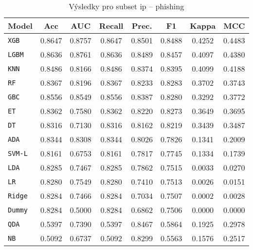 \begin{table}[H]
  \centering
  \small
  \caption{Výsledky pro subset ip – phishing}
  \begin{tabular}{|l|c|c|c|c|c|c|c|}
    \hline
    \textbf{Model} & \textbf{Acc} & \textbf{AUC} & \textbf{Recall} & \textbf{Prec.} & \textbf{F1} & \textbf{Kappa} & \textbf{MCC} \\
    \hline
    \texttt{XGB} & 0.8647 & 0.8757 & 0.8647 & 0.8501 & 0.8488 & 0.4252 & 0.4483 \\
    \texttt{LGBM} & 0.8636 & 0.8761 & 0.8636 & 0.8489 & 0.8457 & 0.4097 & 0.4380 \\
    \texttt{KNN} & 0.8486 & 0.8166 & 0.8486 & 0.8374 & 0.8395 & 0.4099 & 0.4188 \\
    \texttt{RF} & 0.8367 & 0.8196 & 0.8367 & 0.8233 & 0.8283 & 0.3702 & 0.3743 \\
    \texttt{GBC} & 0.8556 & 0.8549 & 0.8556 & 0.8387 & 0.8280 & 0.3292 & 0.3772 \\
    \texttt{ET} & 0.8362 & 0.7580 & 0.8362 & 0.8220 & 0.8273 & 0.3649 & 0.3695 \\
    \texttt{DT} & 0.8316 & 0.7130 & 0.8316 & 0.8162 & 0.8219 & 0.3439 & 0.3487 \\
    \texttt{ADA} & 0.8344 & 0.8308 & 0.8344 & 0.8026 & 0.7826 & 0.1341 & 0.2009 \\
    \texttt{SVM-L} & 0.8161 & 0.6753 & 0.8161 & 0.7817 & 0.7745 & 0.1334 & 0.1739 \\
    \texttt{LDA} & 0.8285 & 0.7467 & 0.8285 & 0.7862 & 0.7515 & 0.0033 & 0.0270 \\
    \texttt{LR} & 0.8280 & 0.7549 & 0.8280 & 0.7410 & 0.7513 & 0.0026 & 0.0151 \\
    \texttt{Ridge} & 0.8284 & 0.7466 & 0.8284 & 0.7034 & 0.7507 & 0.0002 & 0.0028 \\
    \texttt{Dummy} & 0.8284 & 0.5000 & 0.8284 & 0.6862 & 0.7506 & 0.0000 & 0.0000 \\
    \texttt{QDA} & 0.5397 & 0.7390 & 0.5397 & 0.8467 & 0.5864 & 0.1925 & 0.2978 \\
    \texttt{NB} & 0.5092 & 0.6737 & 0.5092 & 0.8299 & 0.5563 & 0.1576 & 0.2517 \\
    \hline
  \end{tabular}
\end{table}
\vspace{0.5cm}

